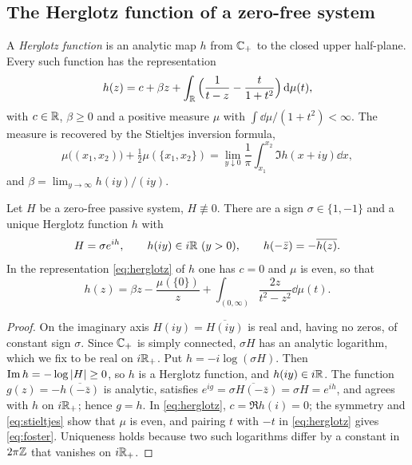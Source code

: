 \subsection{The Herglotz function of a zero-free system}

A \emph{Herglotz function} is an analytic map $h$ from $\mathbb C_{+}$ to the closed
upper half-plane. Every such function has the representation
\cite{nussenzveig,garnett,bernland}
\begin{equation}\label{eq:herglotz}
h(z)=c+\beta z+\int_\mathbb R\Big(\frac1{t-z}-\frac t{1+t^2}\Big)\,\mathrm d\mu(t),
\end{equation}
with $c\in\mathbb R$, $\beta\ge0$ and a positive measure $\mu$ with
$\int\dd\mu/(1+t^2)<\infty$. The measure is recovered by the Stieltjes
inversion formula,
\begin{equation}\label{eq:stieltjes}
\mu\big((x_1,x_2)\big)+\tfrac12\mu(\{x_1,x_2\})
=\lim_{y\downarrow0}\frac1\pi\int_{x_1}^{x_2}\Im h(x+iy)\dd x,
\end{equation}
and $\beta=\lim_{y\to\infty}h(iy)/(iy)$.

\begin{lemma}\label{lem:log}
Let $H$ be a zero-free passive system, $H\not\equiv0$. There are a sign
$\sigma\in\{1,-1\}$ and a unique Herglotz function $h$ with
\begin{equation}\label{eq:Hh}
H=\sigma e^{ih},\qquad h(iy)\in i\mathbb R\ (y>0),\qquad h(-\bar z)=-\overline{h(z)} .
\end{equation}
In the representation \eqref{eq:herglotz} of $h$ one has $c=0$ and $\mu$ is
even, so that
\begin{equation}\label{eq:foster}
h(z)=\beta z-\frac{\mu(\{0\})}{z}+\int_{(0,\infty)}\frac{2z}{t^2-z^2}\dd\mu(t).
\end{equation}
\end{lemma}

\begin{proof}
On the imaginary axis $H(iy)=\overline{H(iy)}$ is real and, having no zeros,
of constant sign $\sigma$. Since $\mathbb C_{+}$ is simply connected, $\sigma H$ has an
analytic logarithm, which we fix to be real on $i\mathbb R_+$. Put
$h=-i\log(\sigma H)$. Then $\operatorname{Im} h=-\log\left|H\right|\ge0$, so $h$ is a Herglotz
function, and $h(iy)\in i\mathbb R$. The function $g(z)=-\overline{h(-\bar z)}$ is
analytic, satisfies $e^{ig}=\overline{\sigma H(-\bar z)}=\sigma H=e^{ih}$, and
agrees with $h$ on $i\mathbb R_+$; hence $g=h$. In \eqref{eq:herglotz}, $c=\Re h(i)=0$;
the symmetry and \eqref{eq:stieltjes} show that $\mu$ is even, and pairing
$t$ with $-t$ in \eqref{eq:herglotz} gives \eqref{eq:foster}. Uniqueness holds
because two such logarithms differ by a constant in $2\pi\mathbb Z$ that vanishes
on $i\mathbb R_+$.
\end{proof}

